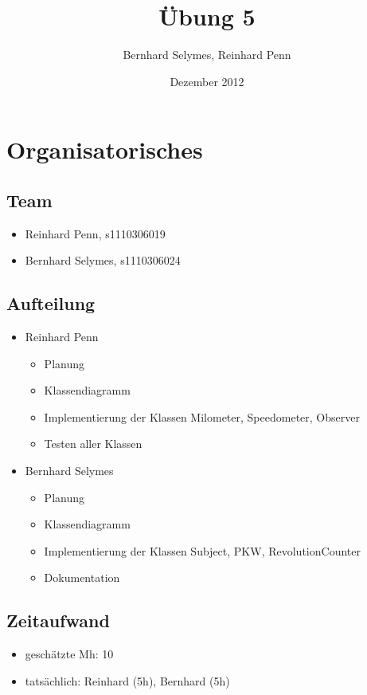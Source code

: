 \documentclass[12pt,a4paper]{article}
\begin{document}
\title{Übung 5}
\author{Bernhard Selymes, Reinhard Penn}
\date{Dezember 2012}

\normalsize

\newcommand{\CodePath}{../DriveSimulation/DriveSimulation/}

\section{Organisatorisches}

\subsection{Team}
	\begin {itemize} 
		\item Reinhard Penn, s1110306019 
		\item Bernhard Selymes, s1110306024
	\end {itemize}

\subsection{Aufteilung}
	\begin {itemize} 
		\item Reinhard Penn
			\begin {itemize}
				\item Planung
				\item Klassendiagramm
				\item Implementierung der Klassen Milometer, Speedometer, Observer
				\item Testen aller Klassen
			\end {itemize}
		\item Bernhard Selymes
			\begin {itemize}
				\item Planung
				\item Klassendiagramm
				\item Implementierung der Klassen Subject, PKW, RevolutionCounter
				\item Dokumentation		
			\end {itemize}
	\end {itemize}


\subsection{Zeitaufwand}
	\begin {itemize}
		\item geschätzte Mh: 10
		\item tatsächlich: Reinhard (5h), Bernhard  (5h)
	\end {itemize}
\end{document}
